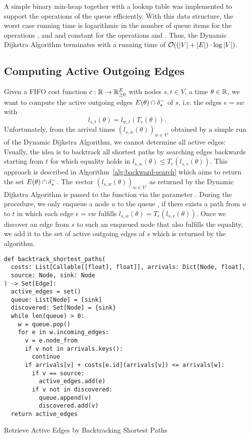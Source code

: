 A simple binary min-heap together with a lookup table was implemented to support the operations of the queue efficiently.
With this data structure, the worst case running time is logarithmic in the number of queue items for the operations ,  and  and constant for the operations  and .
Thus, the Dynamic Dijkstra Algorithm terminates with a running time of $\mathcal{O}( (\left| V \right| + \left| E \right|) \cdot \log \left| V \right|)$.


\subsection{Computing Active Outgoing Edges}\label{sec:compute-active-edges}

Given a FIFO cost function $c: \mathbb{R}\rightarrow\mathbb{R}_{\geq0}^E$ with nodes $s,t\in V$, a time $\theta\in\mathbb{R}$, we want to compute the active outgoing edges $E(\theta) \cap \delta^-_{s}$ of $s$, i.e. the edges $e=sw$ with 
\[
    l_{s,t}(\theta) = l_{w,t}(T_e(\theta)).
\]
Unfortunately, from the arrival times $(l_{s,w}(\theta))_{w\in V'}$ obtained by a simple run of the Dynamic Dijkstra Algorithm, we cannot determine all active edges:
Usually, the idea is to backtrack all shortest paths by searching edges backwards starting from $t$ for which equality holds in $l_{s,w}(\theta) \leq T_e(l_{s,v}(\theta))$.
This approach is described in Algorithm~\ref{alg:backward-search} which aims to return the set $E(\theta)\cap \delta^-_{s}$.
The vector $(l_{s,w}(\theta))_{w\in V'}$ as returned by the Dynamic Dijkstra Algorithm is passed to the function via the parameter .
During the procedure, we only enqueue a node $u$ to the queue , if there exists a path from $u$ to $t$ in which each edge $e=vw$ fulfills $l_{s,w}(\theta)= T_e(l_{s,v}(\theta))$.
Once we discover an edge from $s$ to such an enqueued node that also fulfills the equality, we add it to the set of active outgoing edges of $s$ which is returned by the algorithm.

\begin{algorithm}
    \begin{verbatim}
def backtrack_shortest_paths(
  costs: List[Callable[[float], float]], arrivals: Dict[Node, float],
  source: Node, sink: Node
) -> Set[Edge]:
  active_edges = set()
  queue: List[Node] = [sink]
  discovered: Set[Node] = {sink}
  while len(queue) > 0:
    w = queue.pop()
    for e in w.incoming_edges:
      v = e.node_from
      if v not in arrivals.keys():
        continue
      if arrivals[v] + costs[e.id](arrivals[v]) <= arrivals[w]:
        if v == source:
          active_edges.add(e)
        if v not in discovered:
          queue.append(v)
          discovered.add(v)
  return active_edges
    \end{verbatim}
    \caption{Retrieve Active Edges by Backtracking Shortest Paths}
    \label{alg:backward-search}
\end{algorithm}

